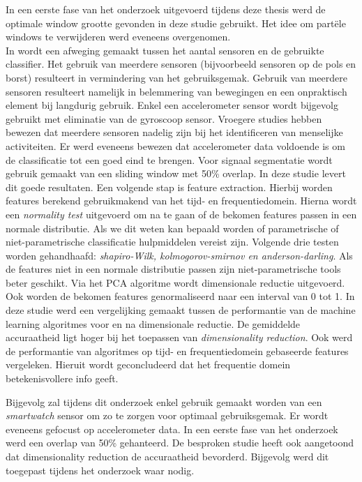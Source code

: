 In een eerste fase van het onderzoek uitgevoerd tijdens deze thesis werd de optimale window grootte gevonden in deze studie gebruikt. Het idee om partële windows te verwijderen werd eveneens overgenomen. \\

In \citep{ref15} wordt een afweging gemaakt tussen het aantal sensoren en de gebruikte classifier. Het gebruik van meerdere sensoren (bijvoorbeeld sensoren op de pols en borst) resulteert in vermindering van het gebruiksgemak. Gebruik van meerdere sensoren resulteert namelijk in belemmering van bewegingen en een onpraktisch element bij langdurig gebruik. 
Enkel een accelerometer sensor wordt bijgevolg gebruikt met eliminatie van de gyroscoop sensor. Vroegere studies hebben bewezen dat meerdere sensoren nadelig zijn bij het identificeren van menselijke activiteiten. Er werd eveneens bewezen dat accelerometer data voldoende is om de classificatie tot een goed eind te brengen.
Voor signaal segmentatie wordt gebruik gemaakt van een sliding window met 50\% overlap. In deze studie levert dit goede resultaten. 
Een volgende stap is feature extraction. Hierbij worden features berekend gebruikmakend van het tijd- en frequentiedomein. Hierna wordt een \textit{normality test} uitgevoerd om na te gaan of de bekomen features passen in een normale distributie. Als we dit weten kan bepaald worden of parametrische of niet-parametrische classificatie hulpmiddelen vereist zijn. Volgende drie testen worden gehandhaafd: \textit{shapiro-Wilk, kolmogorov-smirnov en anderson-darling}. Als de features niet in een normale distributie passen zijn niet-parametrische tools beter geschikt.
Via het PCA algoritme wordt dimensionale reductie uitgevoerd. Ook worden de bekomen features genormaliseerd naar een interval van 0 tot 1.
In deze studie werd een vergelijking gemaakt tussen de performantie van de machine learning algoritmes voor en na dimensionale reductie. De gemiddelde accuraatheid ligt hoger bij het toepassen van \textit{dimensionality reduction}.
Ook werd de performantie van algoritmes op tijd- en frequentiedomein gebaseerde features vergeleken. Hieruit wordt geconcludeerd dat het frequentie domein betekenisvollere info geeft.

Bijgevolg zal tijdens dit onderzoek enkel gebruik gemaakt worden van een \textit{smartwatch} sensor om zo te zorgen voor optimaal gebruiksgemak. Er wordt eveneens gefocust op accelerometer data. In een eerste fase van het onderzoek werd een overlap van 50\% gehanteerd. De besproken studie heeft ook aangetoond dat dimensionality reduction de accuraatheid bevorderd. Bijgevolg werd dit toegepast tijdens het onderzoek waar nodig. \\

